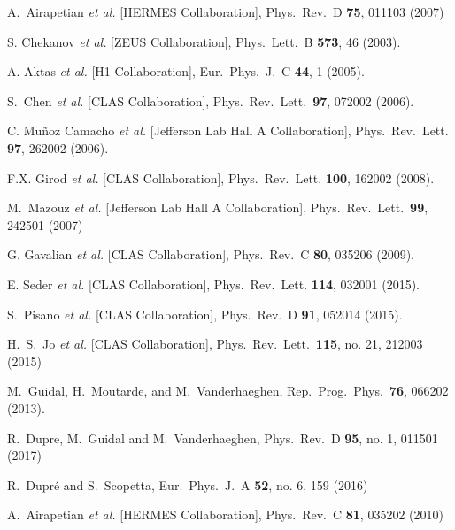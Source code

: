 \documentclass[twocolumn,nofootinbib,showpacs,prl,superscriptaddress,secnumarabic,amssymb,nobibnotes,aps,floatfix]{revtex4}
\begin{document}
\begin{thebibliography}{99}
 A.~Airapetian {\it et al.} [HERMES Collaboration],
Phys.\ Rev.\ D {\bf 75}, 011103 (2007)

S. Chekanov {\it et al.} [ZEUS Collaboration],
Phys.\ Lett.\  B {\bf 573}, 46 (2003).

A. Aktas {\it et al.} [H1 Collaboration],
Eur.\ Phys.\ J.\ C {\bf 44}, 1 (2005).

S.~Chen {\it et al.} [CLAS Collaboration],
Phys.\ Rev.\ Lett.\ {\bf 97}, 072002 (2006).

C. Mu\~noz Camacho {\it et al.} [Jefferson Lab Hall A Collaboration],
Phys.\ Rev.\ Lett. {\bf 97}, 262002 (2006).

F.X. Girod {\it et al.} [CLAS Collaboration],
Phys.\ Rev.\ Lett. {\bf 100}, 162002 (2008).

   M.~Mazouz {\it et al.} [Jefferson Lab Hall A Collaboration],
   Phys.\ Rev.\ Lett.\  {\bf 99}, 242501 (2007)

G. Gavalian {\it et al.} [CLAS Collaboration],
Phys.\ Rev.\ C {\bf 80}, 035206 (2009).

E. Seder {\it et al.} [CLAS Collaboration],
Phys.\ Rev.\ Lett. {\bf 114}, 032001 (2015).

S.~Pisano {\it et al.} [CLAS Collaboration],
Phys.\ Rev.\ D {\bf 91}, 052014 (2015).

 H.~S.~Jo {\it et al.} [CLAS Collaboration],
  Phys.\ Rev.\ Lett.\  {\bf 115}, no. 21, 212003 (2015)

 M.~Guidal, H.~Moutarde, and M.~Vanderhaeghen,
Rep.\ Prog.\ Phys.\  {\bf 76}, 066202 (2013).

 R.~Dupre, M.~Guidal and M.~Vanderhaeghen,
 Phys.\ Rev.\ D {\bf 95}, no. 1, 011501 (2017)

  R.~Dupré and S.~Scopetta,
  Eur.\ Phys.\ J.\ A {\bf 52}, no. 6, 159 (2016)

 A.~Airapetian {\it et al.} [HERMES Collaboration],
Phys.\ Rev.\ C {\bf 81}, 035202 (2010)


\end{thebibliography}
\end{document}
